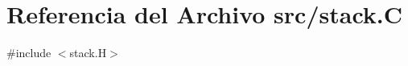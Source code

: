 \hypertarget{stack_8_c}{}\section{Referencia del Archivo src/stack.C}
\label{stack_8_c}
{\ttfamily \#include $<$stack.\+H$>$}\newline
